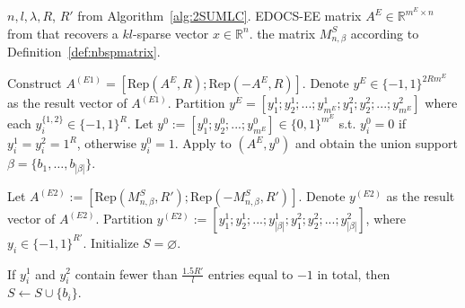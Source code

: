\documentclass{article}
\begin{document}
\begin{algorithm}
\caption{Multi-stage scheme of the MLC under Assumption~\ref{Assumption1}: Overall description}\label{alg:MSPMLC}
\begin{algorithmic}[1]
    \Require $n,l,\lambda,R$, $R'$ from Algorithm~\ref{alg:2SUMLC}. EDOCS-EE matrix $A^E\in \mathbb{R}^{m^E\times n}$ from \cite[Algorithm~4]{li2025support} that recovers a $kl$-sparse vector $x\in \mathbb{R}^n$. the matrix $M_{n,\beta}^S$ according to Definition~\ref{def:nbspmatrix}.
    
    \State Construct
    \(
    A^{(E1)}=[\mathrm{Rep}(A^E,R);\mathrm{Rep}(-A^E,R)]
    \). Denote $y^E\in\{-1,1\}^{2Rm^E}$ as the result vector of $A^{(E1)}$. Partition $y^E=[y_1^1;y_2^1;...;y_{m^E}^1;y_1^2;y_2^2;...;y_{m^E}^2]$ where each $y_i^{\{1,2\}}\in \{-1,1\}^R$. Let $y^0:=[y_1^0;y_2^0;...;y_{m^E}^0]\in\{0,1\}^{m^E}$ s.t. $y_i^0=0$ if $y_i^1=y_i^2=1^R$, otherwise $y_i^0=1$.
    \State Apply \cite[Algorithm~5]{li2025support} to $(A^E,y^0)$ and obtain the union support
$\beta=\{b_1,\ldots,b_{|\beta|}\}$. \begin{scriptsize}
        
    \end{scriptsize} 
    \State Let $A^{(E2)}:=[\mathrm{Rep}(M_{n,\beta}^S,R');\mathrm{Rep}(-M_{n,\beta}^S,R')]$. Denote $y^{(E2)}$ as the result vector of $A^{(E2)}$. Partition $y^{(E2)}:=[y_1^1;y_2^1;...;y_{|\beta|}^1;y_1^2;y_2^2;...;y_{|\beta|}^2]$, where $y_i\in\{-1,1\}^{R'}$. Initialize $S=\varnothing$. 
    \begin{scriptsize}
    \end{scriptsize}
    \State If $y_i^1$ and $y_i^2$ contain fewer than $\frac{1.5R'}{l}$ entries equal to $-1$ in total, then $S\leftarrow S\cup\{b_i\}$. 
    \EndFor
    

\end{algorithmic}
\end{algorithm}
\end{document}
